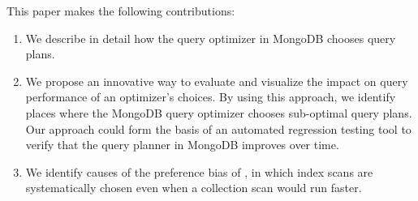 This paper makes the following contributions:\vspace{-1\baselineskip}
\begin{enumerate}
    \item We describe in detail how the \approachName query optimizer in MongoDB chooses query plans.
    \item We propose an innovative way to evaluate and visualize the impact on query performance of an optimizer's choices. By using this approach, we identify places where the MongoDB query optimizer chooses sub-optimal query plans.
    Our approach could form the basis of an automated regression testing tool to verify that the query planner in MongoDB improves over time.
    \item We identify causes of the preference bias of \approachName, in which index scans are systematically chosen even when a collection scan would run faster.
\end{enumerate}

